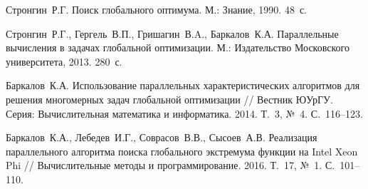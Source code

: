\documentclass[11pt, oneside, a4paper]{article}
\begin{document}
\begin{biblio}

Стронгин~Р.Г. Поиск глобального оптимума. М.: Знание, 1990. 48~с.


Стронгин~Р.Г., Гергель~В.П., Гришагин~В.A., Баркалов~К.А. Параллельные вычисления в задачах глобальной оптимизации. М.: Издательство Московского университета, 2013. 280~с.

Баркалов~К.А. Использование параллельных характеристических алгоритмов для решения многомерных задач глобальной оптимизации  // Вестник ЮУрГУ. Серия: Вычислительная математика и информатика. 2014. Т.~3, №~4. С.~116--123.

Баркалов~К.А., Лебедев~И.Г., Соврасов~В.В., Сысоев~А.В. Реализация параллельного алгоритма поиска глобального экстремума функции на Intel Xeon Phi // Вычислительные методы и программирование. 2016. Т.~17, №~1. С.~101--110.



\end{biblio}
\end{document}
